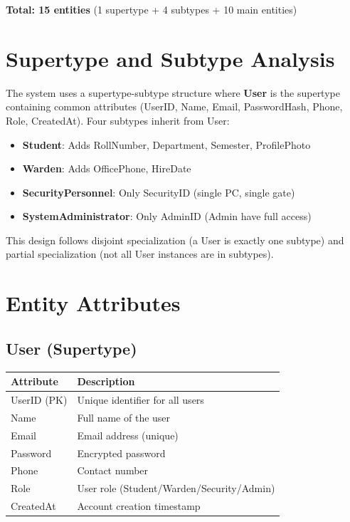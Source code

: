 \documentclass[12pt,a4paper]{article}
\begin{document}
\textbf{Total: 15 entities} (1 supertype + 4 subtypes + 10 main entities)

\section{Supertype and Subtype Analysis}

The system uses a supertype-subtype structure where \textbf{User} is the supertype containing common attributes (UserID, Name, Email, PasswordHash, Phone, Role, CreatedAt). Four subtypes inherit from User:

\begin{itemize}
    \item \textbf{Student}: Adds RollNumber, Department, Semester, ProfilePhoto
    \item \textbf{Warden}: Adds OfficePhone, HireDate
    \item \textbf{SecurityPersonnel}: Only SecurityID (single PC, single gate)
    \item \textbf{SystemAdministrator}: Only AdminID (Admin have full access)
\end{itemize}

This design follows disjoint specialization (a User is exactly one subtype) and partial specialization (not all User instances are in subtypes).

\newpage
\section{Entity Attributes}

\subsection{User (Supertype)}
\begin{longtable}{|p{4cm}|p{8cm}|}
\hline
\textbf{Attribute} & \textbf{Description} \\
\hline
UserID (PK) & Unique identifier for all users \\
Name & Full name of the user \\
Email & Email address (unique) \\
Password & Encrypted password \\
Phone & Contact number \\
Role & User role (Student/Warden/Security/Admin) \\
CreatedAt & Account creation timestamp \\
\hline
\end{longtable}
\end{document}
